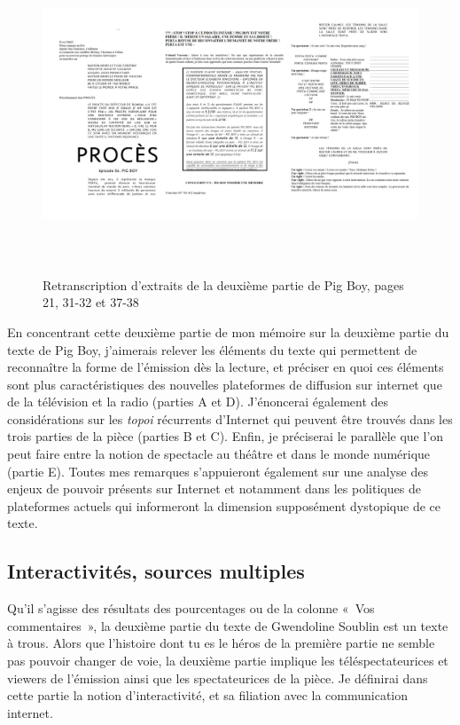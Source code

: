 \documentclass[
]{article}
\begin{document}
\begin{figure}
\centering
\includegraphics[width=17cm,height=9.555cm]{../assets/Pictures/100000000000057800000313E82B7C8B91FC9DF7.jpg}
\caption{Retranscription d'extraits de la deuxième partie de Pig Boy, pages 21, 31-32 et 37-38}\label{fig:fig-2--2-1}
\end{figure}

En concentrant cette deuxième partie de mon mémoire sur la deuxième partie du texte de Pig Boy, j'aimerais relever les éléments du texte qui permettent de reconnaître la forme de l'émission dès la lecture, et préciser en quoi ces éléments sont plus caractéristiques des nouvelles plateformes de diffusion sur internet que de la télévision et la radio (parties A et D). J'énoncerai également des considérations sur les \emph{topoi} récurrents d'Internet qui peuvent être trouvés dans les trois parties de la pièce (parties B et C). Enfin, je préciserai le parallèle que l'on peut faire entre la notion de spectacle au théâtre et dans le monde numérique (partie E). Toutes mes remarques s'appuieront également sur une analyse des enjeux de pouvoir présents sur Internet et notamment dans les politiques de plateformes actuels qui informeront la dimension supposément dystopique de ce texte.

\subsection{Interactivités, sources multiples}\label{interactivituxe9s-sources-multiples}

Qu'il s'agisse des résultats des pourcentages ou de la colonne «~Vos commentaires~», la deuxième partie du texte de Gwendoline Soublin est un texte à trous. Alors que l'histoire dont tu es le héros de la première partie ne semble pas pouvoir changer de voie, la deuxième partie implique les téléspectateurices et viewers de l'émission ainsi que les spectateurices de la pièce. Je définirai dans cette partie la notion d'interactivité, et sa filiation avec la communication internet.
\end{document}
